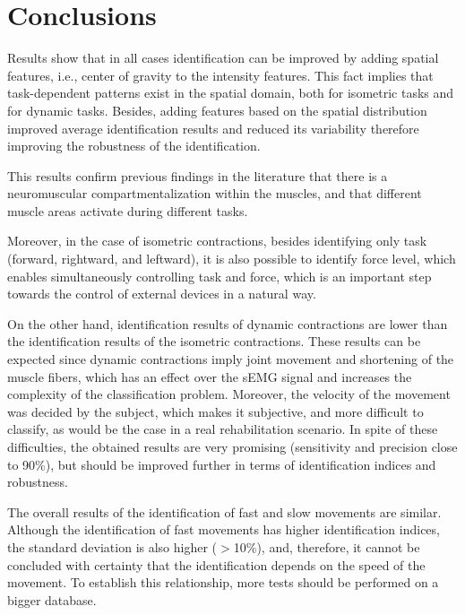 \section{Conclusions}

Results show that in all cases identification can be improved by adding spatial features, i.e., center of gravity to the intensity features. This fact implies that task-dependent patterns exist in the spatial domain, both for isometric tasks and for dynamic tasks. Besides, adding features based on the spatial distribution improved average identification results and reduced its variability therefore improving the robustness of the identification.

This results confirm previous findings in the literature \citep{Hargrove2007, Farina2008, Jordanic2016a, Zhou2007} that there is a  neuromuscular compartmentalization within the muscles, and that different muscle areas activate during different tasks. %

Moreover, in the case of isometric contractions, besides identifying only task (forward, rightward, and leftward), it is also possible to identify force level, which enables simultaneously controlling task and force, which is an important step towards the control of external devices in a natural way. 

On the other hand, identification results of dynamic contractions are lower than the identification results of the isometric contractions. These results can be expected since dynamic contractions imply joint movement and shortening of the muscle fibers, which has an effect over the sEMG signal and increases the complexity of the classification problem. Moreover, the velocity of the movement was decided by the subject, which makes it subjective, and more difficult to classify, as would be the case in a real rehabilitation scenario. In spite of these difficulties, the obtained results are very promising (sensitivity and precision close to 90\%), but should be improved further in terms of identification indices and robustness.

The overall results of the identification of fast and slow movements are similar. Although the identification of fast movements has higher identification indices, the standard deviation is also higher ($>$10\%), and, therefore, it cannot be concluded with certainty that the  identification depends on the speed of the movement. To establish this relationship, more tests should be performed on a bigger database.

